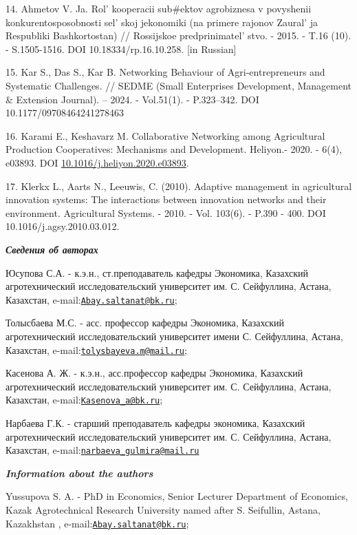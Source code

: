 14. Ahmetov V. Ja. Rol'{} kooperacii sub\#ektov
agrobiznesa v povyshenii konkurentosposobnosti sel' skoj
jekonomiki (na primere rajonov Zaural' ja Respubliki
Bashkortostan) // Rossijskoe predprinimatel' stvo. -
2015. - T.16 (10). - S.1505-1516. DOI 10.18334/rp.16.10.258. {[}in
Russian{]}

15. Kar S., Das S., Kar B. Networking Behaviour of Agri-entrepreneurs
and Systematic Challenges. // SEDME (Small Enterprises Development,
Management \& Extension Journal). -- 2024. - Vol.51(1). - P.323--342.
DOI 10.1177/09708464241278463

16. Karami E., Keshavarz M. Collaborative Networking among Agricultural
Production Cooperatives: Mechanisms and Development. Heliyon.- 2020. -
6(4), e03893. DOI
\href{https://doi.org/10.1016/j.heliyon.2020.e03893}{10.1016/j.heliyon.2020.e03893}.

17. Klerkx L., Aarts N., Leeuwis, C. (2010). Adaptive management in
agricultural innovation systems: The interactions between innovation
networks and their environment. Agricultural Systems. - 2010. - Vol.
103(6). - P.390 - 400. DOI 10.1016/j.agsy.2010.03.012.

\emph{{\bfseries Сведения об авторах}}

Юсупова С.А. - к.э.н., ст.преподаватель кафедры Экономика, Казахский
агротехнический исследовательский университет им. С. Сейфуллина, Астана,
Казахстан,
e-mail:\href{mailto:Abay.saltanat@bk.ru}{\nolinkurl{Abay.saltanat@bk.ru}};

Толысбаева М.С. - асс. профессор кафедры Экономика, Казахский
агротехнический исследовательский университет имени С. Сейфуллина,
Астана, Казахстан,
e-mail:\href{mailto:tolysbayeva.m@mail.ru}{\nolinkurl{tolysbayeva.m@mail.ru}};

Касенова А. Ж. - к.э.н., асс.профессор кафедры Экономика, Казахский
агротехнический исследовательский университет им. С. Сейфуллина, Астана,
Казахстан,
e-mail:\href{mailto:Kasenova_a@bk.ru}{\nolinkurl{Kasenova\_a@bk.ru}};

Нарбаева Г.К. - старший преподаватель кафедры экономика, Казахский
агротехнический исследовательский университет им. С. Сейфуллина, Астана,
Казахстан,
e-mail:\href{mailto:narbaeva_gulmira@mail.ru}{\nolinkurl{narbaeva\_gulmira@mail.ru}}

\emph{{\bfseries Information about the authors}}

Yussupova S. A. - PhD in Economics, Senior Lecturer Department of
Economics, Kazak Agrotechnical Research University named after S.
Seifullin, Astana, Kazakhstan ,
e-mail:\href{mailto:Abay.saltanat@bk.ru}{\nolinkurl{Abay.saltanat@bk.ru}};

